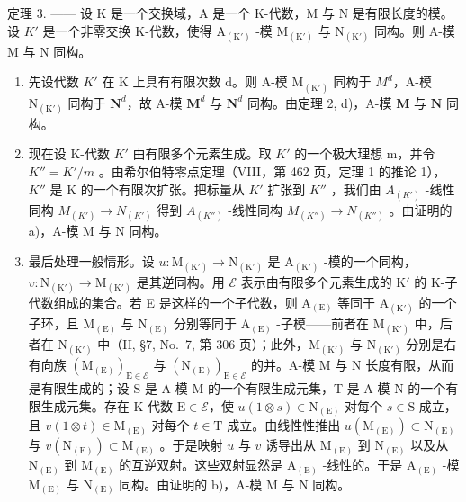 定理 3. —— 设 K 是一个交换域，A 是一个 K-代数，M 与 N 是有限长度的模。设 \(K'\) 是一个非零交换 K-代数，使得 \(\mathrm{A}_{(\mathrm{K}')}\) -模 \(\mathrm{M}_{(\mathrm{K}')}\) 与 \(\mathrm{N}_{(\mathrm{K}')}\) 同构。则 A-模 M 与 N 同构。

\begin{enumerate}
\def\labelenumi{\alph{enumi})}
\item
  先设代数 \(K'\) 在 K 上具有有限次数 d。则 A-模 \(\mathrm{M}_{(\mathrm{K}')}\) 同构于 \(M^{d}\)，A-模 \(\mathrm{N}_{(\mathrm{K}')}\) 同构于 \(\mathbf{N}^d\)，故 A-模 \(\mathbf{M}^d\) 与 \(\mathbf{N}^d\) 同构。由定理 2, d)，A-模 \(\mathbf{M}\) 与 \(\mathbf{N}\) 同构。
\item
  现在设 K-代数 \(K'\) 由有限多个元素生成。取 \(K'\) 的一个极大理想 m，并令 \(K'' = K'/m\) 。由希尔伯特零点定理（VIII，第 462 页，定理 1 的推论 1），\(K''\) 是 K 的一个有限次扩张。把标量从 \(K'\) 扩张到 \(K''\) ，我们由 \(A_{(K')}\) -线性同构 \(M_{(K')} \to N_{(K')}\) 得到 \(A_{(K'')}\) -线性同构 \(M_{(K'')} \to N_{(K'')}\) 。由证明的 a)，A-模 M 与 N 同构。
\item
  最后处理一般情形。设 \(u: \mathrm{M}_{(\mathrm{K}')} \to \mathrm{N}_{(\mathrm{K}')}\) 是 \(\mathrm{A}_{(\mathrm{K}')}\) -模的一个同构，\(v: \mathrm{N}_{(\mathrm{K}')} \to \mathrm{M}_{(\mathrm{K}')}\) 是其逆同构。用 \(\mathcal{E}\) 表示由有限多个元素生成的 \(\mathrm{K}'\) 的 K-子代数组成的集合。若 E 是这样的一个子代数，则 \(\mathrm{A}_{(\mathrm{E})}\) 等同于 \(\mathrm{A}_{(\mathrm{K}')}\) 的一个子环，且 \(\mathrm{M}_{(\mathrm{E})}\) 与 \(\mathrm{N}_{(\mathrm{E})}\) 分别等同于 \(\mathrm{A}_{(\mathrm{E})}\) -子模——前者在 \(\mathrm{M}_{(\mathrm{K}')}\) 中，后者在 \(\mathrm{N}_{(\mathrm{K}')}\) 中（II, §7, No.~7, 第 306 页）；此外，\(\mathrm{M}_{(\mathrm{K}')}\) 与 \(\mathrm{N}_{(\mathrm{K}')}\) 分别是右有向族 \((\mathrm{M}_{(\mathrm{E})})_{\mathrm{E} \in \mathcal{E}}\) 与 \((\mathrm{N}_{(\mathrm{E})})_{\mathrm{E} \in \mathcal{E}}\) 的并。A-模 M 与 N 长度有限，从而是有限生成的；设 S 是 A-模 M 的一个有限生成元集，T 是 A-模 N 的一个有限生成元集。存在 K-代数 \(\mathrm{E} \in \mathcal{E}\)，使 \(u(1 \otimes s) \in \mathrm{N}_{(\mathrm{E})}\) 对每个 \(s \in \mathrm{S}\) 成立，且 \(v(1 \otimes t) \in \mathrm{M}_{(\mathrm{E})}\) 对每个 \(t \in \mathrm{T}\) 成立。由线性性推出 \(u(\mathrm{M}_{(\mathrm{E})}) \subset \mathrm{N}_{(\mathrm{E})}\) 与 \(v(\mathrm{N}_{(\mathrm{E})}) \subset \mathrm{M}_{(\mathrm{E})}\) 。于是映射 \(u\) 与 \(v\) 诱导出从 \(\mathrm{M}_{(\mathrm{E})}\) 到 \(\mathrm{N}_{(\mathrm{E})}\) 以及从 \(\mathrm{N}_{(\mathrm{E})}\) 到 \(\mathrm{M}_{(\mathrm{E})}\) 的互逆双射。这些双射显然是 \(\mathrm{A}_{(\mathrm{E})}\) -线性的。于是 \(\mathrm{A}_{(\mathrm{E})}\) -模 \(\mathrm{M}_{(\mathrm{E})}\) 与 \(\mathrm{N}_{(\mathrm{E})}\) 同构。由证明的 b)，A-模 M 与 N 同构。
\end{enumerate}

